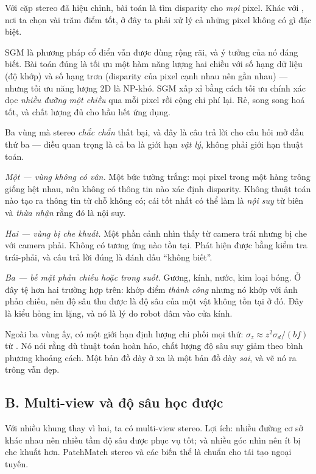 \documentclass[../../vslam.tex]{subfiles}
\begin{document}
Với cặp stereo đã hiệu chỉnh, bài toán là tìm disparity cho \emph{mọi} pixel. Khác với , nơi ta chọn vài trăm điểm tốt, ở đây ta phải xử lý cả những pixel không có gì đặc biệt.

SGM \cite{hirschmuller2008sgm} là phương pháp cổ điển vẫn được dùng rộng rãi, và ý tưởng của nó đáng biết. Bài toán đúng là tối ưu một hàm năng lượng hai chiều với số hạng dữ liệu (độ khớp) và số hạng trơn (disparity của pixel cạnh nhau nên gần nhau) --- nhưng tối ưu năng lượng \(2\)D là NP-khó. SGM xấp xỉ bằng cách tối ưu chính xác dọc \emph{nhiều đường một chiều} qua mỗi pixel rồi cộng chi phí lại. Rẻ, song song hoá tốt, và chất lượng đủ cho hầu hết ứng dụng.

Ba vùng mà stereo \emph{chắc chắn} thất bại, và đây là câu trả lời cho câu hỏi mở đầu thứ ba --- điều quan trọng là cả ba là giới hạn \emph{vật lý}, không phải giới hạn thuật toán.

\emph{Một --- vùng không có vân.} Một bức tường trắng: mọi pixel trong một hàng trông giống hệt nhau, nên không có thông tin nào xác định disparity. Không thuật toán nào tạo ra thông tin từ chỗ không có; cái tốt nhất có thể làm là \emph{nội suy} từ biên và \emph{thừa nhận} rằng đó là nội suy.

\emph{Hai --- vùng bị che khuất.} Một phần cảnh nhìn thấy từ camera trái nhưng bị che với camera phải. Không có tương ứng nào tồn tại. Phát hiện được bằng kiểm tra trái-phải, và câu trả lời đúng là đánh dấu ``không biết''.

\emph{Ba --- bề mặt phản chiếu hoặc trong suốt.} Gương, kính, nước, kim loại bóng. Ở đây tệ hơn hai trường hợp trên: khớp điểm \emph{thành công} nhưng nó khớp với ảnh phản chiếu, nên độ sâu thu được là độ sâu của một vật không tồn tại ở đó. Đây là kiểu hỏng im lặng, và nó là lý do robot đâm vào cửa kính.

Ngoài ba vùng ấy, có một giới hạn định lượng chi phối mọi thứ: \(\sigma_z \approx z^2\sigma_d/(bf)\) từ . Nó nói rằng dù thuật toán hoàn hảo, chất lượng độ sâu suy giảm theo bình phương khoảng cách. Một bản đồ dày ở xa là một bản đồ dày \emph{sai}, và vẽ nó ra trông vẫn đẹp.

\subsection{B. Multi-view và độ sâu học được}

Với nhiều khung thay vì hai, ta có multi-view stereo. Lợi ích: nhiều đường cơ sở khác nhau nên nhiều tầm độ sâu được phục vụ tốt; và nhiều góc nhìn nên ít bị che khuất hơn. PatchMatch stereo và các biến thể là chuẩn cho tái tạo ngoại tuyến.
\end{document}
